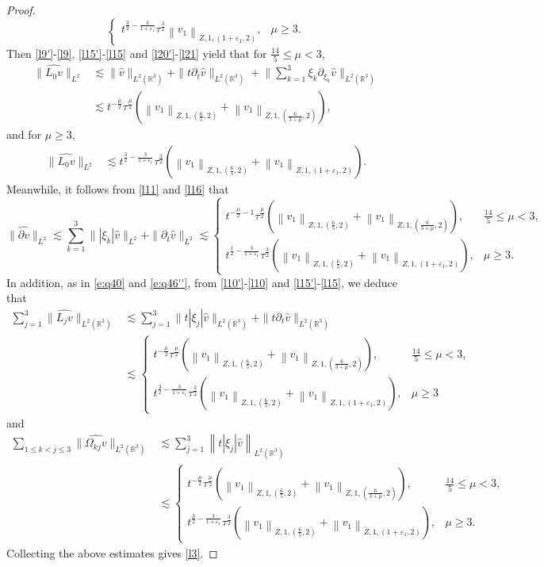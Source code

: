 \documentclass[11pt,twoside]{article}
\newcommand{\R}{\mathbb R}
\newcommand{\p}{\partial}
\newcommand{\f}{\frac}
\theoremstyle{plain}
\theoremstyle{definition}
\theoremstyle{remark}
\numberwithin{equation}{section}
\begin{document}
\begin{proof}
\begin{equation}
\begin{cases}
t^{\f{3}{2}-\f{3}{1+\varepsilon_1}}\tau^\f32\left\|v_1\right\|_{Z, 1,(1+\varepsilon_1, 2)},&\mu\geq3.
\end{cases}
\end{equation}
Then \eqref{l9'}-\eqref{l9}, \eqref{l15'}-\eqref{l15} and \eqref{l20'}-\eqref{l21} yield that for $\f{14}{5}\leq\mu<3$,
$$
\begin{aligned}
\|\widehat{L_0v}\|_{L^2}&\lesssim \|\hat{v}\|_{L^2(\R^3)}+\|t\p_t\hat{v}\|_{L^2(\R^3)}+\big\|\sum_{k=1}^3\xi_k\p_{\xi_k}\hat{v}\big\|_{L^2(\R^3)}\\
&\lesssim t^{-\f{\mu}{2}}\tau^{\f{\mu}{2}}(\left\|v_1\right\|_{Z, 1,(\f65, 2)}+\left\|v_1\right\|_{Z, 1,(\f{6}{3+\mu}, 2)}),
\end{aligned}
$$
and for $\mu\geq3$,
$$
\begin{aligned}
\|\widehat{L_0v}\|_{L^2}
&\lesssim t^{\f{3}{2}-\f{3}{1+\varepsilon_1}}\tau^\f32(\left\|v_1\right\|_{Z, 1,(\f65, 2)}+\left\|v_1\right\|_{Z, 1,(1+\varepsilon_1, 2)}).
\end{aligned}
$$
Meanwhile, it follows from \eqref{l11} and \eqref{l16} that
$$
\|\widehat{\p v}\|_{L^2}\lesssim \sum_{k=1}^3\||\xi_k|\hat{v}\|_{L^2}+\|\p_t\hat{v}\|_{L^2}\lesssim\begin{cases} t^{-\f{\mu}{2}-1}\tau^{\f{\mu}{2}}(\left\|v_1\right\|_{Z, 1,(\f65, 2)}+\left\|v_1\right\|_{Z, 1,(\f{6}{3+\mu}, 2)}),&\f{14}{5}\leq\mu<3,\\
t^{\f{1}{2}-\f{3}{1+\varepsilon_1}}\tau^\f32(\left\|v_1\right\|_{Z, 1,(\f65, 2)}+\left\|v_1\right\|_{Z, 1,(1+\varepsilon_1, 2)}),&\mu\geq3.
\end{cases}
$$
In addition, as in \eqref{e:q40} and \eqref{e:q46''}, from \eqref{l10'}-\eqref{l10} and \eqref{l15'}-\eqref{l15}, we deduce that
$$
\begin{aligned}
\sum_{j=1}^3\|\widehat{L_jv}\|_{L^2(\R^3)}&\lesssim \sum_{j=1}^3\|t|\xi_j|\hat{v}\|_{L^2(\R^3)}+\|t\p_t\hat{v}\|_{L^2(\R^3)}\\
&\lesssim \begin{cases} t^{-\f{\mu}{2}}\tau^{\f{\mu}{2}}(\left\|v_1\right\|_{Z, 1,(\f65, 2)}+\left\|v_1\right\|_{Z, 1,(\f{6}{3+\mu}, 2)}),&\f{14}{5}\leq\mu<3,\\
t^{\f{3}{2}-\f{3}{1+\varepsilon_1}}\tau^\f32(\left\|v_1\right\|_{Z, 1,(\f65, 2)}+\left\|v_1\right\|_{Z, 1,(1+\varepsilon_1, 2)}),&\mu\geq3
\end{cases}
\end{aligned}
$$
and
$$
\begin{aligned}
\sum_{1\leq k<j\leq3}\|\widehat{\Omega_{kj}v}\|_{L^2(\R^3)}&\lesssim \sum_{j=1}^3\left\|t|\xi_j|\hat{v}\right\|_{L^2(\R^3)}\\
&\lesssim \begin{cases} t^{-\f{\mu}{2}}\tau^{\f{\mu}{2}}(\left\|v_1\right\|_{Z, 1,(\f65, 2)}+\left\|v_1\right\|_{Z, 1,(\f{6}{3+\mu}, 2)}),&\f{14}{5}\leq\mu<3,\\
t^{\f{3}{2}-\f{3}{1+\varepsilon_1}}\tau^\f32(\left\|v_1\right\|_{Z, 1,(\f65, 2)}+\left\|v_1\right\|_{Z, 1,(1+\varepsilon_1, 2)}),&\mu\geq3.
\end{cases}
\end{aligned}
$$
Collecting the above estimates gives \eqref{l3}.



\end{proof}
\end{document}
